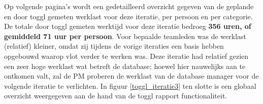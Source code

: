 \documentclass{article}
\begin{document}
\noindent Op volgende pagina's wordt een gedetailleerd overzicht gegeven van de geplande en door toggl gemeten werklast voor deze iteratie, per persoon en per categorie. De totale door toggl gemeten werktijd voor deze iteratie bedroeg \textbf{356 uren, of gemiddeld 71 uur per persoon}. Voor bepaalde teamleden was de werklast (relatief) kleiner, omdat zij tijdens de vorige iteraties een basis hebben opgebouwd waarop vlot verder te werken was. Deze iteratie had relatief gezien een zeer hoge werklast wat betreft de database; hoewel hier nauwelijks aan te ontkomen valt, zal de PM proberen de werklast van de database manager voor de volgende iteratie te verlichten. In figuur \ref{toggl_iteratie3} ten slotte is een globaal overzicht weergegeven aan de hand van de toggl rapport functionaliteit. 
\end{document}
